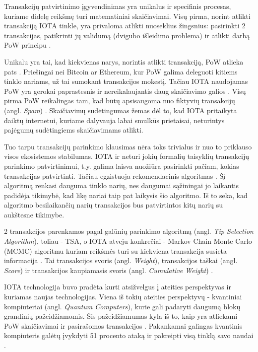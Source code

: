 Transakcijų patvirtinimo įgyvendinimas yra unikalus ir specifinis procesas, kuriame didelę reikšmę turi matematiniai skaičiavimai. Visų pirma, norint atlikti transakciją IOTA tinkle, yra privaloma atlikti nuoseklius žingsnius: pasirinkti 2 transakcijas, patikrinti jų validumą (dvigubo išleidimo problema) ir atlikti darbą PoW principu \cite{popov2016tangle}. 

Unikalu yra tai, kad kiekvienas narys, norintis atlikti transakciją, PoW atlieka pats \cite{bramas2018stability}. Priešingai nei Bitcoin ar Ethereum, kur PoW galima deleguoti kitiems tinklo nariams, už tai sumokant transakcijos mokestį. Tačiau IOTA naudojamas PoW yra gerokai paprastesnis ir nereikalaujantis daug skaičiavimo galios \cite{popov2016tangle}. Visų pirma PoW reikalingas tam, kad būtų apsisaugoma nuo fiktyvių transakcijų (angl. \textit{Spam}) \cite{popov2016tangle}. Skaičiavimų sudėtingumas žemas dėl to, kad IOTA pritaikyta daiktų internetui, kuriame dalyvauja labai smulkūs prietaisai, neturintys pajėgumų sudėtingiems skaičiavimams atlikti.

Tuo tarpu transakcijų parinkimo klausimas nėra toks trivialus ir nuo to priklauso visos ekosistemos stabilumas. IOTA ir neturi jokių formalių taisyklių transakcijų parinkimo patvirtinimui, t.y. galima laisva nuožiūra pasirinkti pačiam, kokias transakcijas patvirtinti. Tačiau egzistuoja rekomendacinis algoritmas \cite{popov2016tangle}. Šį algoritmą renkasi dauguma tinklo narių, nes daugumai sąžiningai jo laikantis padidėja tikimybė, kad likę nariai taip pat laikysis šio algoritmo. Iš to seka, kad algoritmo besilaikančių narių transakcijos bus patvirtintos kitų narių su aukštesne tikimybe.

2 transakcijos parenkamos pagal galūnių parinkimo algoritmą (angl. \textit{Tip Selection Algorithm}), toliau - TSA, o IOTA atveju konkrečiai - Markov Chain Monte Carlo (MCMC) algoritmu kuriam reikšmės turi su kiekviena transakcija susieta informacija \cite{bramas2018stability}. Tai transakcijos svoris (angl. \textit{Weight}), transakcijos taškai (angl. \textit{Score}) ir transakcijos kaupiamasis svoris (angl. \textit{Cumulative Weight}) \cite{popov2016tangle}. 





IOTA technologija buvo pradėta kurti atsižvelgus į ateities perspektyvas ir kuriamas naujas technologijas. Viena iš tokių ateities perspektyvų - kvantiniai kompiuteriai (angl. \textit{Quantum Computers}), kurie gali padaryti daugumą blokų grandinių pažeidžiamomis. Šis pažeidžiamumas kyla iš to, kaip yra atliekami PoW skaičiavimai ir pasirašomos transakcijos \cite{kiktenko2018quantum}. Pakankamai galingas kvantinis kompiuteris galėtų įvykdyti 51 procento ataką ir pakreipti visą tinklą savo naudai \cite{kiktenko2018quantum}. 

